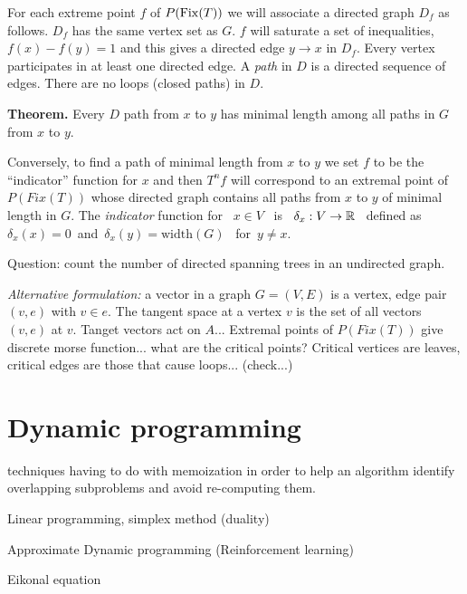 \documentclass[11pt]{article}
\begin{document}
For each extreme point $f$ of $P(\mathrm{Fix}(T))$ 
we will associate a directed graph $D_f$
as follows.
$D_f$ has the same vertex set as $G$.
$f$ will saturate a set of inequalities,
$f(x)-f(y)=1$
and this gives a directed edge $y\to x$ in $D_f.$
Every vertex participates in at least one
directed edge.
A \emph{path} in $D$ is a directed sequence of edges.
There are no loops (closed paths) in $D$.

{\bf Theorem.} Every $D$ path from $x$ to $y$ has
minimal length among all paths in $G$ from $x$ to $y.$

Conversely, to find a path of minimal length 
from $x$ to $y$ we set $f$ to be the ``indicator''
function for $x$ and then $T^nf$ will correspond
to an extremal point of $P(Fix(T))$ whose directed
graph contains all paths from $x$ to $y$ of minimal length in $G.$
The \emph{indicator} function for \ $x\in V$ \ is \ $\delta_x:V\to \mathbb R$ 
\ defined as\ $\delta_x(x)=0$\ and\ $\delta_x(y)=\mathrm{width}(G)$
\ for\ $y\ne x.$

Question: count the number of directed spanning trees in an undirected graph.

\emph{Alternative formulation:}
a vector in a graph $G=(V,E)$ is a vertex, edge pair $(v,e)$ with $v\in e.$
The tangent space at a vertex $v$ is the set of all vectors $(v,e)$
at $v$.
Tanget vectors act on $A$...
Extremal points of $P(Fix(T))$ give discrete morse function...
what are the critical points?
Critical vertices are leaves, critical edges are those that cause loops... (check...)



%
%

\section{Dynamic programming}

techniques having to do with memoization 
in order to help an algorithm identify overlapping subproblems and avoid re-computing them.

Linear programming, simplex method (duality)

Approximate Dynamic programming (Reinforcement learning)

Eikonal equation
\end{document}
